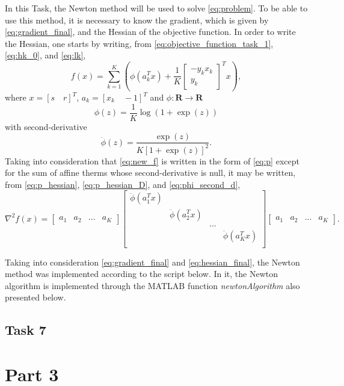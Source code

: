 \documentclass[12pt]{article}
\begin{document}
In this Task, the Newton method will be used to solve \eqref{eq:problem}. To be able to use this method, it is necessary to know the gradient, which is given by \eqref{eq:gradient_final}, and the Hessian of the objective function. In order to write the Hessian, one starts by writing, from \eqref{eq:objective_function_task_1}, \eqref{eq:hk_0}, and \eqref{eq:lk},
\begin{equation} \label{eq:new_f}
    f(x) = \sum_{k=1}^K \left (\phi \left (a_k^T x \right) + \frac{1}{K} \begin{bmatrix}
    -y_k x_k \\
    y_k
    \end{bmatrix}^T x \right),
\end{equation}
where $x = [s \quad r]^T$, $a_k = [x_k \quad -1]^T$ and $\phi:\mathbf{R} \rightarrow \mathbf{R}$
\begin{equation} \label{eq:new_phi}
    \phi (z) = \frac{1}{K}\log (1 + \exp (z))
\end{equation}
with second-derivative
\begin{equation} \label{eq:phi_second_d}
    \ddot{\phi} (z) = \frac{\exp(z)}{K \left[1+\exp(z)\right]^2}.
\end{equation}
Taking into consideration that \eqref{eq:new_f} is written in the form of \eqref{eq:p} except for the sum of affine therms whose second-derivative is null, it may be written, from \eqref{eq:p_hessian}, \eqref{eq:p_hessian_D}, and \eqref{eq:phi_second_d},
\begin{equation} \label{eq:hessian_final}
    \nabla^2 f(x) = \begin{bmatrix}
    a_1 & a_2 & ... & a_K
    \end{bmatrix} 
    \begin{bmatrix}
    \ddot{\phi}(a_1^T x) &&& \\
    & \ddot{\phi}(a_2^T x) && \\
    &&...&\\
    &&& \ddot{\phi}(a_K^T x) \\
    \end{bmatrix}
    \begin{bmatrix}
    a_1 & a_2 & ... & a_K
    \end{bmatrix}.
\end{equation}

Taking into consideration \eqref{eq:gradient_final} and \eqref{eq:hessian_final}, the Newton method was implemented according to the script below. In it, the Newton algorithm is implemented through the MATLAB function \textit{newtonAlgorithm} also presented below.

\subsection{Task 7}

\section{Part 3}
\end{document}
